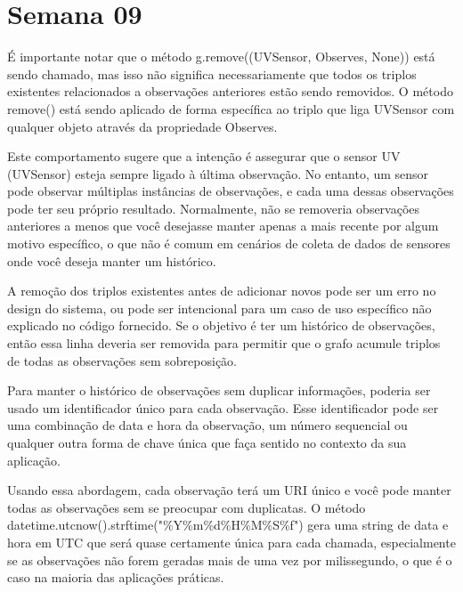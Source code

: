 \section{Semana 09}


É importante notar que o método g.remove((UVSensor, Observes, None)) está sendo chamado, mas isso não significa necessariamente que todos os triplos existentes relacionados a observações anteriores estão sendo removidos. O método remove() está sendo aplicado de forma específica ao triplo que liga UVSensor com qualquer objeto através da propriedade Observes.

Este comportamento sugere que a intenção é assegurar que o sensor UV (UVSensor) esteja sempre ligado à última observação. No entanto, um sensor pode observar múltiplas instâncias de observações, e cada uma dessas observações pode ter seu próprio resultado. Normalmente, não se removeria observações anteriores a menos que você desejasse manter apenas a mais recente por algum motivo específico, o que não é comum em cenários de coleta de dados de sensores onde você deseja manter um histórico.

A remoção dos triplos existentes antes de adicionar novos pode ser um erro no design do sistema, ou pode ser intencional para um caso de uso específico não explicado no código fornecido. Se o objetivo é ter um histórico de observações, então essa linha deveria ser removida para permitir que o grafo acumule triplos de todas as observações sem sobreposição.

Para manter o histórico de observações sem duplicar informações, poderia ser usado um identificador único para cada observação. Esse identificador pode ser uma combinação de data e hora da observação, um número sequencial ou qualquer outra forma de chave única que faça sentido no contexto da sua aplicação.

Usando essa abordagem, cada observação terá um URI único e você pode manter todas as observações sem se preocupar com duplicatas. O método datetime.utcnow().strftime("\%Y\%m\%d\%H\%M\%S\%f") gera uma string de data e hora em UTC que será quase certamente única para cada chamada, especialmente se as observações não forem geradas mais de uma vez por milissegundo, o que é o caso na maioria das aplicações práticas.
